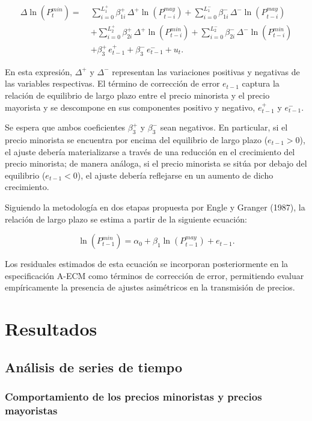 \documentclass[
  12pt,
]{article}
\begin{document}
\[
\begin{aligned}
\Delta \ln(P_t^{min}) =\;&
\sum_{i=0}^{L_1^+} \beta_{1i}^+ \, \Delta^+ \ln(P_{t-i}^{may})
+ \sum_{i=0}^{L_1^-} \beta_{1i}^- \, \Delta^- \ln(P_{t-i}^{may}) \\
&+ \sum_{i=0}^{L_2^+} \beta_{2i}^+ \, \Delta^+ \ln(P_{t-i}^{min})
+ \sum_{i=0}^{L_2^-} \beta_{2i}^- \, \Delta^- \ln(P_{t-i}^{min}) \\
&+ \beta_3^+ \, e_{t-1}^+
+ \beta_3^- \, e_{t-1}^-
+ u_t .
\end{aligned}
\]

En esta expresión, \(\Delta^+\) y \(\Delta^-\) representan las
variaciones positivas y negativas de las variables respectivas. El
término de corrección de error \(e_{t-1}\) captura la relación de
equilibrio de largo plazo entre el precio minorista y el precio
mayorista y se descompone en sus componentes positivo y negativo,
\(e_{t-1}^+\) y \(e_{t-1}^-\).

Se espera que ambos coeficientes \(\beta_3^+\) y \(\beta_3^-\) sean
negativos. En particular, si el precio minorista se encuentra por encima
del equilibrio de largo plazo (\(e_{t-1} > 0\)), el ajuste debería
materializarse a través de una reducción en el crecimiento del precio
minorista; de manera análoga, si el precio minorista se sitúa por debajo
del equilibrio (\(e_{t-1} < 0\)), el ajuste debería reflejarse en un
aumento de dicho crecimiento.

Siguiendo la metodología en dos etapas propuesta por Engle y Granger
(1987), la relación de largo plazo se estima a partir de la siguiente
ecuación:

\[
\ln(P_{t-1}^{min}) = \alpha_0 + \beta_1 \ln(P_{t-1}^{may}) + e_{t-1}.
\]

Los residuales estimados de esta ecuación se incorporan posteriormente
en la especificación A-ECM como términos de corrección de error,
permitiendo evaluar empíricamente la presencia de ajustes asimétricos en
la transmisión de precios.

\section{Resultados}\label{resultados}

\subsection{Análisis de series de
tiempo}\label{anuxe1lisis-de-series-de-tiempo}

\subsubsection{Comportamiento de los precios minoristas y precios
mayoristas}\label{comportamiento-de-los-precios-minoristas-y-precios-mayoristas}
\end{document}

